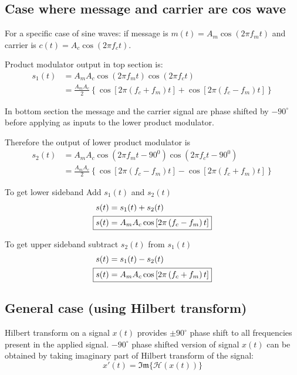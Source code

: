 \subsection{Case where message and carrier are cos wave}
For a specific case of sine waves: 
if message is $m(t) = A_m \cos\left ( 2 \pi f_mt \right )$ and carrier is $c(t) = A_c \cos\left ( 2 \pi f_ct \right )$.

Product modulator output in top section is:
\begin{align*}
	s_1\left ( t \right )&=A_mA_c \cos \left ( 2 \pi f_mt \right ) \cos\left ( 2 \pi f_ct \right ) \\
	&=\frac{A_mA_c}{2} \left \{ \cos \left [ 2 \pi\left ( f_c+f_m \right )t \right ]+ \cos\left [ 2 \pi\left ( f_c-f_m \right )t \right ] \right \}
\end{align*}

In bottom section the message and the carrier signal are phase shifted by $-90^\circ$ before applying as inputs to the lower product modulator.

Therefore the output of lower product modulator is
\begin{align*}
	s_2\left ( t \right ) &=A_mA_c \cos\left ( 2 \pi f_mt-90^0 \right ) \cos\left (2 \pi f_ct-90^0  \right ) \\
	 &=\frac{A_mA_c}{2} \left \{ \cos \left [ 2 \pi\left ( f_c-f_m \right )t \right ]- \cos\left [ 2 \pi\left ( f_c+f_m \right )t \right ] \right \}
\end{align*}

To get lower sideband Add $s_1(t)$ and $s_2(t)$
\begin{align*}
	s(t) &= s_1(t) + s_2(t) \\
	\Aboxed{s(t)&=A_mA_c \cos \left [ 2 \pi\left ( f_c-f_m \right )t \right ]}
\end{align*}

To get upper sideband subtract $s_2(t)$ from $s_1(t)$
\begin{align*}
	s(t) &= s_1(t) - s_2(t) \\
	\Aboxed{s(t) &=A_mA_c \cos \left [ 2 \pi\left ( f_c+f_m \right )t \right ]}
\end{align*}

\subsection{General case (using Hilbert transform)}
Hilbert transform on a signal $x(t)$ provides $\pm 90^\circ$ phase shift to all frequencies present in the applied signal.
$-90^\circ$ phase shifted version of signal $x(t)$ can be obtained by taking imaginary part of Hilbert transform of the signal:
$$x'(t) = \mathfrak{Im}\{\mathcal{H}(x(t))\}$$

